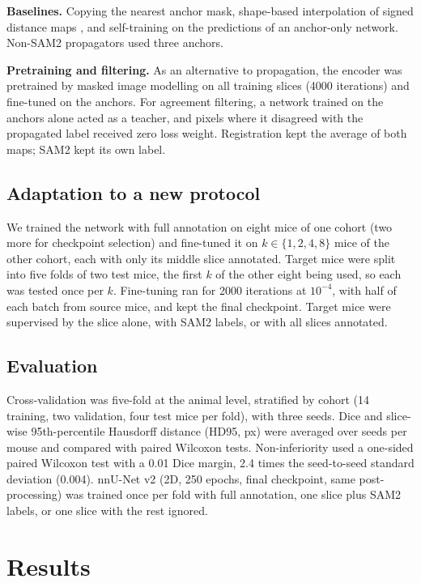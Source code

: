 \textbf{Baselines.} Copying the nearest anchor mask, shape-based interpolation of signed distance maps \cite{raya1990shape}, and self-training \cite{bai2017semi} on the predictions of an anchor-only network. Non-SAM2 propagators used three anchors.

\textbf{Pretraining and filtering.} As an alternative to propagation, the encoder was pretrained by masked image modelling \cite{ali2025ssl} on all training slices (4000 iterations) and fine-tuned on the anchors. For agreement filtering, a network trained on the anchors alone acted as a teacher, and pixels where it disagreed with the propagated label received zero loss weight. Registration kept the average of both maps; SAM2 kept its own label.

\subsection{Adaptation to a new protocol}
\label{sec:adapt}

We trained the network with full annotation on eight mice of one cohort (two more for checkpoint selection) and fine-tuned it on $k\in\{1,2,4,8\}$ mice of the other cohort, each with only its middle slice annotated. Target mice were split into five folds of two test mice, the first $k$ of the other eight being used, so each was tested once per $k$. Fine-tuning ran for 2000 iterations at $10^{-4}$, with half of each batch from source mice, and kept the final checkpoint. Target mice were supervised by the slice alone, with SAM2 labels, or with all slices annotated.

\subsection{Evaluation}

Cross-validation was five-fold at the animal level, stratified by cohort (14 training, two validation, four test mice per fold), with three seeds. Dice and slice-wise 95th-percentile Hausdorff distance (HD95, px) were averaged over seeds per mouse and compared with paired Wilcoxon tests. Non-inferiority used a one-sided paired Wilcoxon test with a 0.01 Dice margin, 2.4 times the seed-to-seed standard deviation (0.004). nnU-Net v2 \cite{isensee2021nnunet} (2D, 250 epochs, final checkpoint, same post-processing) was trained once per fold with full annotation, one slice plus SAM2 labels, or one slice with the rest ignored.

\section{Results}
\label{sec:results}

